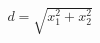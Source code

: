 \documentclass[preview]{standalone}
\begin{document}
\begin{align*}
d = \sqrt{x_1^2 + x_2^2}
\end{align*}
\end{document}
